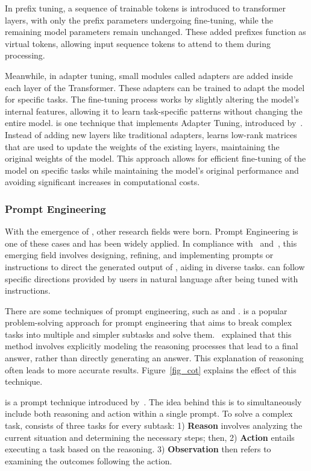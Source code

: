 In prefix tuning, a sequence of trainable tokens is introduced to transformer layers, with only the prefix parameters undergoing fine-tuning, while the remaining model parameters remain unchanged. These added prefixes function as virtual tokens, allowing input sequence tokens to attend to them during processing.

Meanwhile, in adapter tuning, small modules called adapters are added inside each layer of the Transformer. These adapters can be trained to adapt the model for specific tasks. The fine-tuning process works by slightly altering the model's internal features, allowing it to learn task-specific patterns without changing the entire model. {\lora} is one technique that implements Adapter Tuning, introduced by~\citet{hu_lora_2021}. Instead of adding new layers like traditional adapters, {\lora} learns low-rank matrices that are used to update the weights of the existing layers, maintaining the original weights of the model. This approach allows for efficient fine-tuning of the model on specific tasks while maintaining the model's original performance and avoiding significant increases in computational costs.


\subsubsection{Prompt Engineering}

With the emergence of {\llm}, other research fields were born. Prompt Engineering is one of these cases and has been widely applied. In compliance with~\citet{mesko_prompt_2023} and~\citet{ma_beyond_2023}, this emerging field involves designing, refining, and implementing prompts or instructions to direct the generated output of {\llm}, aiding in diverse tasks. {\llm} can follow specific directions provided by users in natural language after being tuned with instructions.

There are some techniques of prompt engineering, such as {\chain} and {\react}. {\chain} is a popular problem-solving approach for prompt engineering that aims to break complex tasks into multiple and simpler subtasks and solve them.~\citet{wei_chain--thought_2023} explained that this method involves explicitly modeling the reasoning processes that lead to a final answer, rather than directly generating an answer. This explanation of reasoning often leads to more accurate results. Figure~\ref{fig_cot} explains the effect of this technique.

{\react} is a prompt technique introduced by~\citet{yao_react_2023}. The idea behind this is to simultaneously include both reasoning and action within a single prompt. To solve a complex task, {\react} consists of three tasks for every subtask: 1) \textbf{Reason} involves analyzing the current situation and determining the necessary steps; then, 2) \textbf{Action} entails executing a task based on the reasoning. 3) \textbf{Observation} then refers to examining the outcomes following the action.


